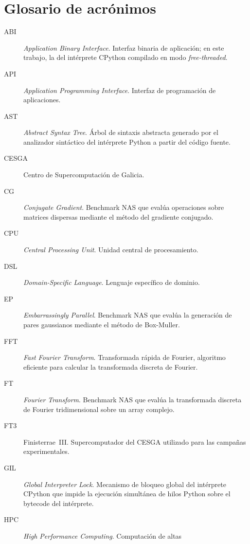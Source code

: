 \chapter{Glosario de acrónimos}
\label{chap:acronimos}


\begin{description}
  \item[ABI] \emph{Application Binary Interface}. Interfaz binaria de
        aplicación; en este trabajo, la del intérprete CPython compilado en
        modo \emph{free-threaded}.
  \item[API] \emph{Application Programming Interface}. Interfaz de programación
        de aplicaciones.
  \item[AST] \emph{Abstract Syntax Tree}. Árbol de sintaxis abstracta generado
        por el analizador sintáctico del intérprete Python a partir del código
        fuente.
  \item[CESGA] Centro de Supercomputación de Galicia.
  \item[CG] \emph{Conjugate Gradient}. Benchmark NAS que evalúa operaciones
        sobre matrices dispersas mediante el método del gradiente conjugado.
  \item[CPU] \emph{Central Processing Unit}. Unidad central de procesamiento.
  \item[DSL] \emph{Domain-Specific Language}. Lenguaje específico de dominio.
  \item[EP] \emph{Embarrassingly Parallel}. Benchmark NAS que evalúa la
        generación de pares gaussianos mediante el método de Box-Muller.
  \item[FFT] \emph{Fast Fourier Transform}. Transformada rápida de Fourier,
        algoritmo eficiente para calcular la transformada discreta de Fourier.
  \item[FT] \emph{Fourier Transform}. Benchmark NAS que evalúa la
        transformada discreta de Fourier tridimensional sobre un array
        complejo.
  \item[FT3] Finisterrae~III. Supercomputador del CESGA utilizado para las
        campañas experimentales.
  \item[GIL] \emph{Global Interpreter Lock}. Mecanismo de bloqueo global del
        intérprete CPython que impide la ejecución simultánea de hilos Python
        sobre el bytecode del intérprete.
  \item[HPC] \emph{High Performance Computing}. Computación de altas

\end{description}
